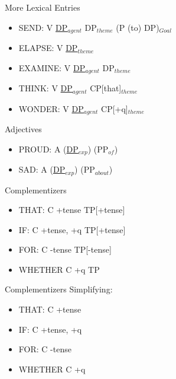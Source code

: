 \begin{frame}
  {More Lexical Entries}
  \begin{itemize}
  \item SEND:  V \underline{DP$_{agent}$} DP$_{theme}$ (P (to) DP)$_{Goal}$
  \item ELAPSE: V \underline{DP$_{theme}$}
  \item EXAMINE: V \underline{DP$_{agent}$} DP$_{theme}$
  \item THINK: V \underline{DP$_{agent}$} CP[that]$_{theme}$
  \item WONDER: V \underline{DP$_{agent}$} CP[+q]$_{theme}$
  \end{itemize}
\end{frame}



\begin{frame}
  {Adjectives}

  \begin{itemize}
  \item PROUD: A (\underline{DP$_{exp}$}) (PP$_{of}$)
  \item SAD: A  (\underline{DP$_{exp}$}) (PP$_{about}$)
  \end{itemize}
\end{frame}

\begin{frame}
  {Complementizers}
  \begin{itemize}
  \item THAT: C +tense TP[+tense]
  \item IF: C +tense, +q TP[+tense]
  \item FOR: C -tense TP[-tense]
  \item WHETHER C +q TP
  \end{itemize}
\end{frame}
\begin{frame}
  {Complementizers}
Simplifying:
  \begin{itemize}
  \item THAT: C +tense 
  \item IF: C +tense, +q
  \item FOR: C -tense
  \item WHETHER C +q
  \end{itemize}
\end{frame}

